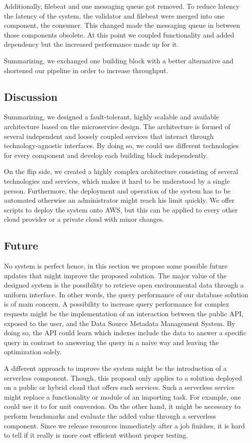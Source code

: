 Additionally, filebeat and one messaging queue got removed. To reduce
latency the latency of the system, the validator and filebeat were
merged into one component, the consumer. This changed made the messaging
queue in between those components obsolete. At this point we coupled
functionality and added dependency but the increased performance made up
for it.

Summarizing, we exchanged one building block with a better alternative
and shortened our pipeline in order to increase throughput.

\subsection{Discussion}\label{discussion}

Summarizing, we designed a fault-tolerant, highly scalable and available
architecture based on the microservice design. The architecture is
formed of several independent and loosely coupled services that interact
through technology-agnostic interfaces. By doing so, we could use
different technologies for every component and develop each building
block independently.

On the flip side, we created a highly complex architecture consisting of
several technologies and services, which makes it hard to be understood
by a single person. Furthermore, the deployment and operation of the
system has to be automated otherwise an administrator might reach his
limit quickly. We offer scripts to deploy the system onto AWS, but this
can be applied to every other cloud provider or a private cloud with
minor changes.

\subsection{Future}\label{future}

No system is perfect hence, in this section we propose some possible
future updates that might improve the proposed solution. The major value
of the designed system is the possibility to retrieve open environmental
data through a uniform interface. In other words, the query performance
of our database solution is of main concern. A possibility to increase
query performance for complex requests might be the implementation of an
interaction between the public API, exposed to the user, and the Data
Source Metadata Management System. By doing so, the API could learn
which indexes include the data to answer a specific query in contrast to
answering the query in a naive way and leaving the optimization solely.

A different approach to improve the system might be the introduction of
a serverless component. Though, this proposal only applies to a solution
deployed on a public or hybrid cloud that offers such services. Such a
serverless service might replace a functionality or module of an
importing task. For example, one could use it to for unit conversion. On
the other hand, it might be necessary to perform benchmarks and evaluate
the added value through a serverless component. Since we release
resources immediately after a job finishes, it is hard to tell if it
really is more cost efficient without proper testing.
